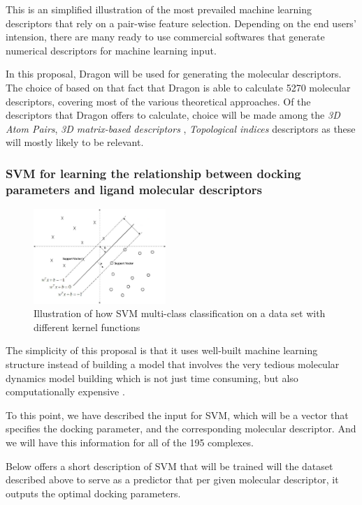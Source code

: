 This is an simplified illustration of the most prevailed machine learning descriptors 
that rely on a pair-wise feature selection.
Depending on the end users' intension, there are many ready to use commercial softwares that generate numerical descriptors for machine learning input.

In this proposal, Dragon will be used for generating the molecular descriptors.
The choice of based on that fact that Dragon is able to calculate 5270 molecular descriptors, covering most of the various theoretical approaches.
Of the descriptors that Dragon offers to calculate, choice will be made among the 
\textit{3D Atom Pairs}, \textit{3D matrix-based descriptors} , \textit{Topological indices} descriptors as these will mostly likely to be relevant.

\subsubsection{SVM for learning the relationship between docking parameters and ligand molecular descriptors} \label{svm}

\begin{figure}%
\includegraphics[width=0.445\textwidth]{../figures/svm_intro.png}
\caption{Illustration of how SVM multi-class classification on a data set with different kernel functions\cite{svm_sklearn}}
\label{fig:svm}
\end{figure}

The simplicity of this proposal is that it uses well-built machine learning structure instead of building a model that involves the very tedious molecular dynamics model building which is not just time consuming, but also computationally expensive \cite{Lo2018}.

To this point, we have described the input for SVM, which will be a vector that specifies the docking parameter, and the corresponding molecular descriptor. 
And we will have this information for all of the 195 complexes.

Below offers a short description of SVM that will be trained will the dataset described above to serve as a predictor that per given molecular descriptor, it outputs the optimal docking parameters.

